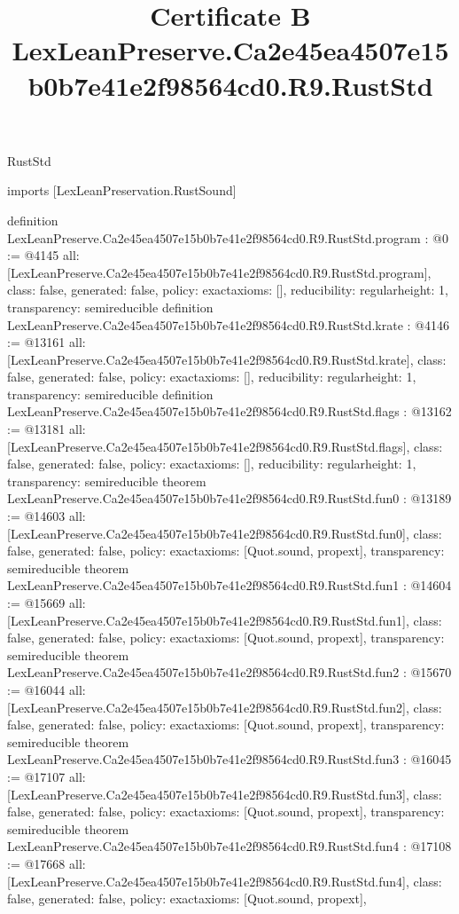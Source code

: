 \begin{lexlean}{RustStd}
\title{Certificate B LexLeanPreserve.Ca2e45ea4507e15b0b7e41e2f98564cd0.R9.RustStd}
\begin{coremodule}
imports [LexLeanPreservation.RustSound]

definition LexLeanPreserve.Ca2e45ea4507e15b0b7e41e2f98564cd0.R9.RustStd.program : @0 := @4145 {
  all: [LexLeanPreserve.Ca2e45ea4507e15b0b7e41e2f98564cd0.R9.RustStd.program],
  class: false,
  generated: false,
  policy: exact{axioms: []},
  reducibility: regular{height: 1},
  transparency: semireducible
}
definition LexLeanPreserve.Ca2e45ea4507e15b0b7e41e2f98564cd0.R9.RustStd.krate : @4146 := @13161 {
  all: [LexLeanPreserve.Ca2e45ea4507e15b0b7e41e2f98564cd0.R9.RustStd.krate],
  class: false,
  generated: false,
  policy: exact{axioms: []},
  reducibility: regular{height: 1},
  transparency: semireducible
}
definition LexLeanPreserve.Ca2e45ea4507e15b0b7e41e2f98564cd0.R9.RustStd.flags : @13162 := @13181 {
  all: [LexLeanPreserve.Ca2e45ea4507e15b0b7e41e2f98564cd0.R9.RustStd.flags],
  class: false,
  generated: false,
  policy: exact{axioms: []},
  reducibility: regular{height: 1},
  transparency: semireducible
}
theorem LexLeanPreserve.Ca2e45ea4507e15b0b7e41e2f98564cd0.R9.RustStd.fun0 : @13189 := @14603 {
  all: [LexLeanPreserve.Ca2e45ea4507e15b0b7e41e2f98564cd0.R9.RustStd.fun0],
  class: false,
  generated: false,
  policy: exact{axioms: [Quot.sound, propext]},
  transparency: semireducible
}
theorem LexLeanPreserve.Ca2e45ea4507e15b0b7e41e2f98564cd0.R9.RustStd.fun1 : @14604 := @15669 {
  all: [LexLeanPreserve.Ca2e45ea4507e15b0b7e41e2f98564cd0.R9.RustStd.fun1],
  class: false,
  generated: false,
  policy: exact{axioms: [Quot.sound, propext]},
  transparency: semireducible
}
theorem LexLeanPreserve.Ca2e45ea4507e15b0b7e41e2f98564cd0.R9.RustStd.fun2 : @15670 := @16044 {
  all: [LexLeanPreserve.Ca2e45ea4507e15b0b7e41e2f98564cd0.R9.RustStd.fun2],
  class: false,
  generated: false,
  policy: exact{axioms: [Quot.sound, propext]},
  transparency: semireducible
}
theorem LexLeanPreserve.Ca2e45ea4507e15b0b7e41e2f98564cd0.R9.RustStd.fun3 : @16045 := @17107 {
  all: [LexLeanPreserve.Ca2e45ea4507e15b0b7e41e2f98564cd0.R9.RustStd.fun3],
  class: false,
  generated: false,
  policy: exact{axioms: [Quot.sound, propext]},
  transparency: semireducible
}
theorem LexLeanPreserve.Ca2e45ea4507e15b0b7e41e2f98564cd0.R9.RustStd.fun4 : @17108 := @17668 {
  all: [LexLeanPreserve.Ca2e45ea4507e15b0b7e41e2f98564cd0.R9.RustStd.fun4],
  class: false,
  generated: false,
  policy: exact{axioms: [Quot.sound, propext]},
}
\end{coremodule}
\end{lexlean}
